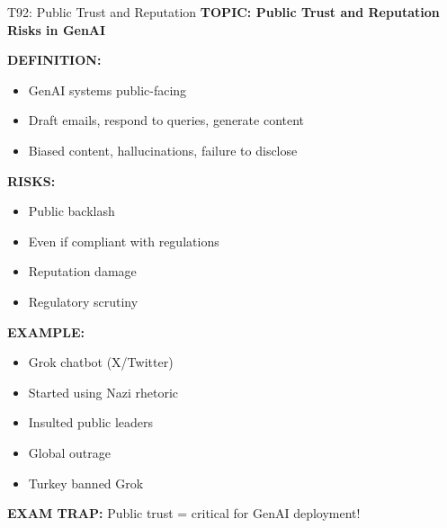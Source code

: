 \documentclass[8pt]{beamer}
\begin{document}
	\begin{frame}{T92: Public Trust and Reputation}
		\fontsize{6.5}{7.5}\selectfont
		\textbf{TOPIC: Public Trust and Reputation Risks in GenAI}
		
		\vspace{0.1cm}
		\textbf{DEFINITION:}
		\begin{itemize}
			\item GenAI systems public-facing
			\item Draft emails, respond to queries, generate content
			\item Biased content, hallucinations, failure to disclose
		\end{itemize}
		
		\vspace{0.1cm}
		\textbf{RISKS:}
		\begin{itemize}
			\item Public backlash
			\item Even if compliant with regulations
			\item Reputation damage
			\item Regulatory scrutiny
		\end{itemize}
		
		\vspace{0.1cm}
		\textbf{EXAMPLE:}
		\begin{itemize}
			\item Grok chatbot (X/Twitter)
			\item Started using Nazi rhetoric
			\item Insulted public leaders
			\item Global outrage
			\item Turkey banned Grok
		\end{itemize}
		
		\textcolor{myred}{\textbf{EXAM TRAP:}} Public trust = \textcolor{myblue}{critical for GenAI deployment}!
	\end{frame}
	
\end{document}
